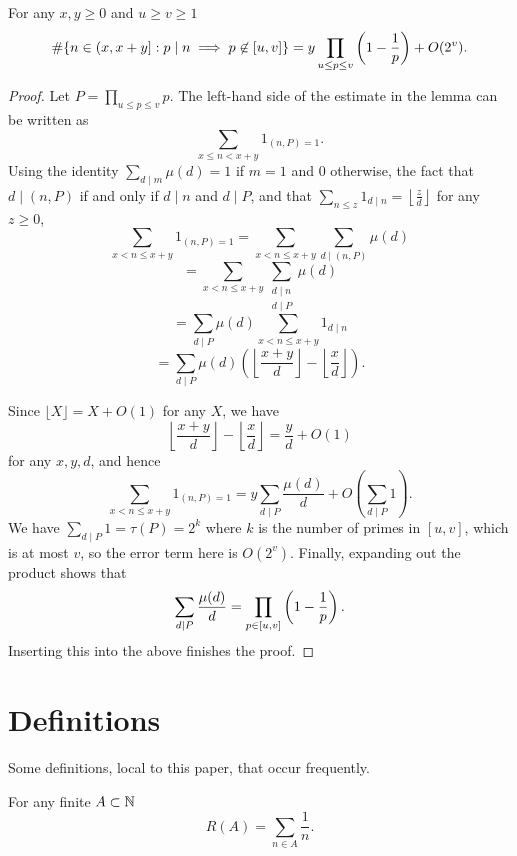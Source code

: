 \begin{lemma}\label{lem:sieve_eratosthenes}
  \leanok
For any $x,y\geq 0$ and $u\geq v\geq 1$
\[\#\{ n\in (x,x+y] : p\mid n\implies p\not\in [u,v]\} = y\prod_{u\leq p\leq v}\left( 1-\frac{1}{p}\right)+O(2^v).\]
\end{lemma}
\begin{proof}
  \leanok
Let $P = \prod_{u\leq p\leq v}p$. The left-hand side of the estimate in the lemma can be written as
\[\sum_{x\leq n<x+y}1_{(n,P)=1}.\]
Using the identity $\sum_{d\mid m}\mu(d) = 1$ if $m=1$ and $0$ otherwise, the fact that $d\mid (n,P)$ if and only if $d\mid n$ and $d\mid P$, and that $\sum_{n\leq z}1_{d\mid n}=\left\lfloor\frac{z}{d}\right\rfloor$ for any $z\geq 0$,
\[
\sum_{x< n\leq x+y}1_{(n,P)=1}= \sum_{x< n\leq x+y}\sum_{d\mid (n,P)}\mu(d)\]
\[= \sum_{x< n\leq x+y}\sum_{\substack{d\mid n\\ d\mid P}}\mu(d)\]
\[=\sum_{d\mid P}\mu(d)\sum_{x< n\leq x+y}1_{d\mid n}\]
\[=\sum_{d\mid P}\mu(d)\left(\left\lfloor \frac{x+y}{d}\right\rfloor-\left\lfloor\frac{x}{d}\right\rfloor\right).\]

Since $\lfloor X\rfloor = X+O(1)$ for any $X$, we have
\[\left\lfloor \frac{x+y}{d}\right\rfloor-\left\lfloor\frac{x}{d}\right\rfloor=\frac{y}{d}+O(1)\]
 for any $x,y,d$, and hence
\[\sum_{x< n\leq x+y}1_{(n,P)=1}=y\sum_{d\mid P}\frac{\mu(d)}{d}+O(\sum_{d\mid P}1).\]
We have $\sum_{d\mid P}1=\tau(P)=2^k$ where $k$ is the number of primes in $[u,v]$, which is at most $v$, so the error term here is $O(2^v)$. Finally, expanding out the product shows that
\[\sum_{d\mid P}\frac{\mu(d)}{d} = \prod_{p\in[u,v]}\left( 1-\frac{1}{p}\right).\]
Inserting this into the above finishes the proof.
\end{proof}










\chapter{Definitions}
\label{chap:def}

Some definitions, local to this paper, that occur frequently.

\begin{definition}
  \label{def:rec_sum}
  \leanok
  For any finite $A\subset \mathbb{N}$
  \[R(A)=\sum_{n\in A}\frac{1}{n}.\]
\end{definition}

